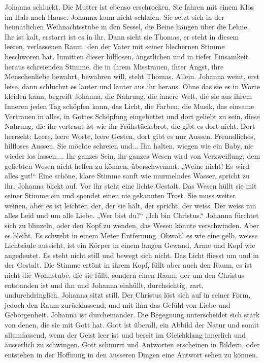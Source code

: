 Johanna schluckt. 
Die Mutter ist ebenso erschrocken. Sie fahren mit einem Klos im Hals nach Hause.
Johanna kann nicht schlafen. Sie setzt sich in der heimatlichen Weihnachtsstube in den Sessel, die Beine hängen über die Lehne. Ihr ist kalt, erstarrt ist es in ihr. 
Dann sieht sie Thomas, er steht in diesem leeren, verlassenen Raum, den der Vater mit seiner blechernen Stimme beschworen hat. Inmitten dieser hilflosen,  ängstlichen und in tiefer Einsamkeit heraus schreienden Stimme, die in ihrem Misstrauen, ihrer Angst, ihre Menschenliebe bewahrt, bewahren will, steht Thomas. Allein. 
Johanna weint, erst leise, dann schluchzt es lauter und lauter aus ihr heraus. Ohne das sie es in Worte kleiden kann, begreift Johanna, die Nahrung, die innere Welt, die sie aus ihrem Inneren jeden Tag schöpfen kann, das Licht, die Farben, die Musik, das einsame Vertrauen in alles, in Gottes Schöpfung eingebettet und dort geliebt zu sein, diese Nahrung, die ihr vertraut ist wie ihr Frühstücksbrot, die gibt es dort nicht. Dort herrscht: Leere, leere Worte, leere Gesten, dort gibt es nur Aussen. Freundliches, hilfloses Aussen.
Sie möchte schreien und...
Ihn halten, wiegen wie ein Baby, nie wieder los lassen,...
Ihr ganzes Sein, ihr ganzes Wesen wird von Verzweiflung, dem geliebten Wesen nicht helfen zu können, überschwemmt.
„Weine nicht! Es wird alles gut!“ Eine schöne, klare Stimme sanft wie murmelndes Wasser, spricht zu ihr. Johanna blickt auf. Vor ihr steht eine lichte Gestalt. Das Wesen hüllt sie mit seiner Stimme ein und spendet einen nie gekannten Trost. Sie muss weiter weinen, aber es ist leichter, der, der sie hält, der spricht, der weiss. Der weiss um alles Leid und um alle Liebe. „Wer bist du?“ „Ich bin Christus.“ Johanna fürchtet sich zu blinzeln, oder den Kopf zu wenden, das Wesen könnte verschwinden. Aber es bleibt. Es schwebt in einem Meter Entfernung. Obwohl es wie eine gelb, weisse Lichtsäule aussieht, ist ein Körper in einem langen Gewand, Arme und Kopf wie angedeutet.  Es steht nicht still und bewegt sich nicht. Das Licht fliesst um und in der Gestalt. Die Stimme ertönt in ihrem Kopf, füllt aber auch den Raum, es ist nicht die Wohnstube, die sie füllt, sondern einen Raum, der um den Christus entstanden ist und ihn und Johanna einhüllt, durchsichtig, zart, undurchdringlich.
Johanna sitzt still. Der Christus löst sich auf in seiner Form, jedoch den Raum zurücklassend, und mit ihm das Gefühl von Liebe und Geborgenheit. 
Johanna ist durcheinander. Die Begegnung unterscheidet sich stark von denen, die sie mit Gott hat. Gott ist überall, ein Abbild der Natur und somit allumfassend, wenn der Geist leer ist und bereit im Gleichklang innerlich und äusserlich zu schwingen. Gott schnurrt und Antworten erscheinen in Bildern, oder entstehen in der Hoffnung in den äusseren Dingen eine Antwort sehen zu können.
